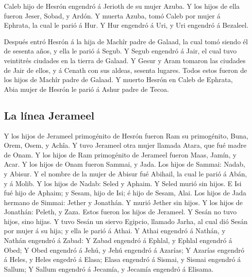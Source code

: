  Caleb hijo de Hesrón engendró á Jerioth de su mujer
Azuba. Y los hijos de ella fueron Jeser, Sobad, y Ardón. 
Y muerta Azuba, tomó Caleb por mujer á Ephrata, la cual le parió á Hur.
 Y Hur engendró á Uri, y Uri engendró á Bezaleel.

 Después entró Hesrón á la hija de Machîr padre de
Galaad, la cual tomó siendo él de sesenta años, y ella le parió á Segub.
 Y Segub engendró á Jair, el cual tuvo veintitrés
ciudades en la tierra de Galaad.  Y Gesur y Aram tomaron
las ciudades de Jair de ellos, y á Cenath con sus aldeas, sesenta
lugares. Todos estos fueron de los hijos de Machîr padre de Galaad.
 Y muerto Hesrón en Caleb de Ephrata, Abia mujer de
Hesrón le parió á Ashur padre de Tecoa.

\hypertarget{la-luxednea-jerameel}{%
\subsection{La línea Jerameel}\label{la-luxednea-jerameel}}

 Y los hijos de Jerameel primogénito de Hesrón fueron Ram
su primogénito, Buna, Orem, Osem, y Achîa.  Y tuvo
Jerameel otra mujer llamada Atara, que fué madre de Onam.
 Y los hijos de Ram primogénito de Jerameel fueron Maas,
Jamín, y Acar.  Y los hijos de Onam fueron Sammai, y
Jada. Los hijos de Sammai: Nadab, y Abisur.  Y el nombre
de la mujer de Abisur fué Abihail, la cual le parió á Abán, y á Molib.
 Y los hijos de Nadab: Seled y Aphaim. Y Seled murió sin
hijos.  E Isi fué hijo de Aphaim; y Sesam, hijo de Isi; é
hijo de Sesam, Alai.  Los hijos de Jada hermano de
Simmai: Jether y Jonathán. Y murió Jether sin hijos.  Y
los hijos de Jonathán: Peleth, y Zaza. Estos fueron los hijos de
Jerameel.  Y Sesán no tuvo hijos, sino hijas.
 Y tuvo Sesán un siervo Egipcio, llamado Jarha, al cual
dió Sesán por mujer á su hija; y ella le parió á Athai. 
Y Athai engendró á Nathán, y Nathán engendró á Zabad:  Y
Zabad engendró á Ephlal, y Ephlal engendró á Obed;  Y
Obed engendró á Jehú, y Jehú engendró á Azarías;  Y
Azarías engendró á Heles, y Heles engedró á Elasa;  Elasa
engendró á Sismai, y Sismai engendró á Sallum;  Y Sallum
engendró á Jecamía, y Jecamía engendró á Elisama.

